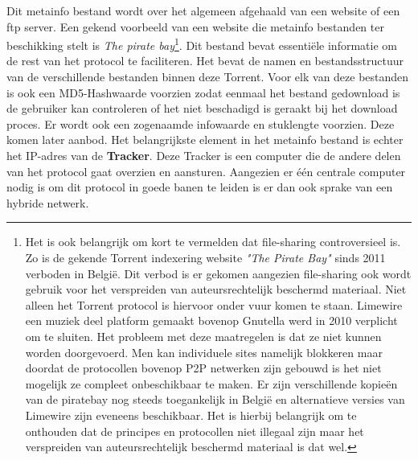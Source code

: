 Dit metainfo bestand wordt over het algemeen afgehaald van een website of een ftp server. Een gekend voorbeeld van een website die metainfo bestanden ter beschikking stelt is \textit{The pirate bay}\footnote{Het is ook belangrijk om kort te vermelden dat file-sharing controversieel is. Zo is de gekende Torrent indexering website \textit{"The Pirate Bay"} sinds 2011 verboden in België. Dit verbod is er gekomen aangezien file-sharing ook wordt gebruik voor het verspreiden van auteursrechtelijk beschermd materiaal. Niet alleen het Torrent protocol is hiervoor onder vuur komen te staan. Limewire een muziek deel platform gemaakt bovenop Gnutella werd in 2010 verplicht om te sluiten. Het probleem met deze maatregelen is dat ze niet kunnen worden doorgevoerd. Men kan individuele sites namelijk  blokkeren maar doordat de protocollen bovenop P2P netwerken zijn gebouwd is het niet mogelijk ze compleet onbeschikbaar te maken. Er zijn verschillende kopieën van de piratebay nog steeds toegankelijk in België en alternatieve versies van Limewire zijn eveneens beschikbaar. Het is hierbij belangrijk om te onthouden dat de principes en protocollen niet illegaal zijn maar het verspreiden van auteursrechtelijk beschermd materiaal is dat wel.}. Dit bestand bevat essentiële informatie om de rest van het protocol te faciliteren. Het bevat de namen en bestandsstructuur van de verschillende bestanden binnen deze Torrent. Voor elk van deze bestanden is ook een MD5-Hashwaarde voorzien zodat eenmaal het bestand gedownload is de gebruiker kan controleren of het niet beschadigd is geraakt bij het download proces. Er wordt ook een zogenaamde infowaarde en stuklengte voorzien. Deze komen later aanbod. Het belangrijkste element in het metainfo bestand is echter het IP-adres van de \textbf{Tracker}. Deze Tracker is een computer die de andere delen van het protocol gaat overzien en aansturen. Aangezien er één centrale computer nodig is om dit protocol in goede banen te leiden is er dan ook sprake van een hybride netwerk.\\


